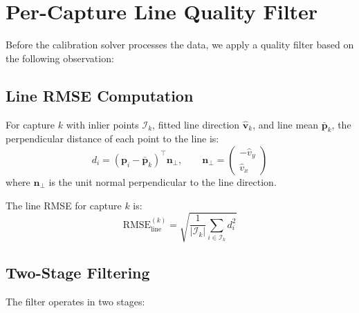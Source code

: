 \documentclass[12pt,a4paper]{article}
\newcommand{\pvec}{\mathbf{p}}
\begin{document}
\section{Per-Capture Line Quality Filter}
\label{sec:filter}

Before the calibration solver processes the data, we apply a quality
filter based on the following observation:

\begin{center}
\end{center}

\subsection{Line RMSE Computation}

For capture $k$ with inlier points $\mathcal{I}_k$, fitted line direction
$\hat{\mathbf{v}}_k$, and line mean $\bar{\pvec}_k$, the
perpendicular distance of each point to the line is:
\begin{equation}
    d_i = (\pvec_i - \bar{\pvec}_k)^\top \mathbf{n}_\perp, \qquad
    \mathbf{n}_\perp = \begin{pmatrix} -\hat{v}_y \\ \hat{v}_x \end{pmatrix}
    \label{eq:line_dist}
\end{equation}
where $\mathbf{n}_\perp$ is the unit normal perpendicular to the line direction.

The line RMSE for capture $k$ is:
\begin{equation}
    \text{RMSE}_{\text{line}}^{(k)} = \sqrt{\frac{1}{|\mathcal{I}_k|}
    \sum_{i \in \mathcal{I}_k} d_i^2}
    \label{eq:line_rmse}
\end{equation}

\subsection{Two-Stage Filtering}

The filter operates in two stages:
\end{document}
